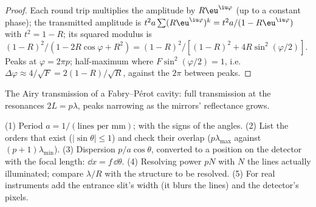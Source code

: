 \begin{proof}
Each round trip multiplies the amplitude by $R\eu^{\iu\varphi}$ (up to a
constant phase); the transmitted amplitude is $t^2a\sum(R\eu^{\iu\varphi})^k =
t^2a/(1 - R\eu^{\iu\varphi})$ with $t^2 = 1 - R$; its squared modulus is $(1 - R)^2/
(1 - 2R\cos\varphi + R^2) = (1 - R)^2/[(1 - R)^2 + 4R\sin^2(\varphi/2)]$. Peaks at
$\varphi = 2\pi p$; half-maximum where $F\sin^2(\varphi/2) = 1$, i.e.\ $\Delta\varphi \approx
4/\sqrt F = 2(1 - R)/\sqrt R$, against the $2\pi$ between peaks.
\end{proof}

\begin{omfigure}

{\small The Airy transmission of a Fabry--Pérot cavity: full
transmission at the resonances $2L = p\lambda$, peaks narrowing as the
mirrors' reflectance grows.}
\end{omfigure}

\begin{method}\label{met:b2:gratings:method}
(1) Period $a = 1/(\text{lines per mm})$;  with the
signs of the angles. (2) List the orders that exist ($|\sin\theta| \le 1$)
and check their overlap ($p\lambda_{\max}$ against $(p + 1)\lambda_{\min}$). (3)
Dispersion $p/a\cos\theta$, converted to a position on the detector with
the focal length: $\dd x = f\,\dd\theta$. (4) Resolving power $pN$ with $N$ the
lines actually illuminated; compare $\lambda/R$ with the structure to be
resolved. (5) For real instruments add the entrance slit's width (it
blurs the lines) and the detector's pixels.
\end{method}


